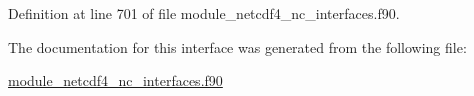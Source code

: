 Definition at line 701 of file module\+\_\+netcdf4\+\_\+nc\+\_\+interfaces.\+f90.



The documentation for this interface was generated from the following file\+:\begin{DoxyCompactItemize}
\item 
\hyperlink{module__netcdf4__nc__interfaces_8f90}{module\+\_\+netcdf4\+\_\+nc\+\_\+interfaces.\+f90}\end{DoxyCompactItemize}
